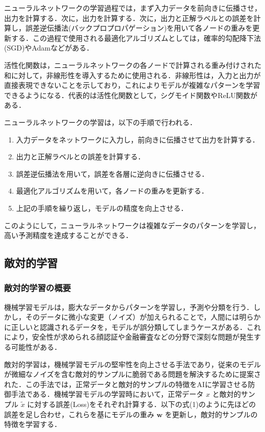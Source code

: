 ニューラルネットワークの学習過程では，まず入力データを前向きに伝播させ，出力を計算する．次に，出力を計算する．次に，出力と正解ラベルとの誤差を計算し，誤差逆伝播法(バックプロプロパゲーション)を用いて各ノードの重みを更新する．この過程で使用される最適化アルゴリズムとしては，確率的勾配降下法(SGD)やAdamなどがある．

活性化関数は，ニューラルネットワークの各ノードで計算される重み付けされた和に対して，非線形性を導入するために使用される．非線形性は，入力と出力が直接表現できないことを示しており，これによりモデルが複雑なパターンを学習できるようになる．\cite{kikagaku-NN}代表的は活性化関数として，シグモイド関数やReLU関数がある．

ニューラルネットワークの学習は，以下の手順で行われる．
\begin{enumerate}
    \item 入力データをネットワークに入力し，前向きに伝播させて出力を計算する．
    \item 出力と正解ラベルとの誤差を計算する．
    \item 誤差逆伝播法を用いて，誤差を各層に逆向きに伝播させる．
    \item 最適化アルゴリズムを用いて，各ノードの重みを更新する．
    \item 上記の手順を繰り返し，モデルの精度を向上させる．
\end{enumerate}

このようにして，ニューラルネットワークは複雑なデータのパターンを学習し，高い予測精度を達成することができる．

\subsection{敵対的学習}
\subsubsection{敵対的学習の概要}
機械学習モデルは，膨大なデータからパターンを学習し，予測や分類を行う．しかし，そのデータに微小な変更（ノイズ）が加えられることで，人間には明らかに正しいと認識されるデータを，モデルが誤分類してしまうケースがある．これにより，安全性が求められる顔認証や金融審査などの分野で深刻な問題が発生する可能性がある．

敵対的学習は，機械学習モデルの堅牢性を向上させる手法であり，従来のモデルが微細なノイズを含む敵対的サンプルに脆弱である問題を解決するために提案された\cite{goodfellow2015explaining}．この手法では，正常データと敵対的サンプルの特徴をAIに学習させる防御手法である．機械学習モデルの学習時において，正常データ $x$ と敵対的サンプル $\tilde{x}$ に対する誤差(Loss)をそれぞれ計算する．以下の式(1)のように先ほどの誤差を足し合わせ，これらを基にモデルの重み $\bm{w}$ を更新し，敵対的サンプルの特徴を学習する．

